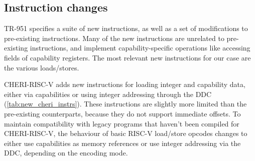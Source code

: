 \subsection{Instruction changes}
TR-951\cite[Chapter 8]{TR-951} specifies a suite of new instructions, as well as a set of modifications to pre-existing instructions.
Many of the new instructions are unrelated to pre-existing instructions, and implement capability-specific operations like accessing fields of capability registers.
The most relevant new instructions for our case are the various loads/stores.

CHERI-RISC-V adds new instructions for loading integer and capability data, either via capabilities or using integer addressing through the DDC (\cref{tab:new_cheri_instrs}).
These instructions are slightly more limited than the pre-existing counterparts, because they do not support immediate offsets. 
To maintain compatibility with legacy programs that haven't been compiled for CHERI-RISC-V, the behaviour of basic RISC-V load/store opcodes changes to either use capabilities as memory references or use integer addressing via the DDC, depending on the encoding mode.


